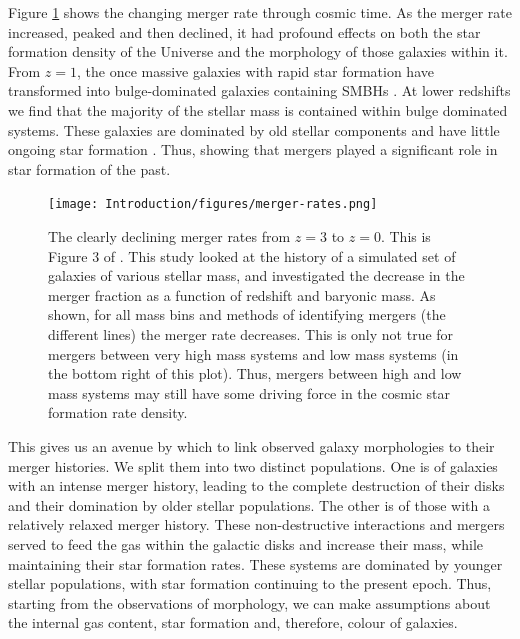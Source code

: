 Figure \ref{fig:merger-rate} shows the changing merger rate through cosmic time. As the merger rate increased, peaked and then declined, it had profound effects on both the star formation density of the Universe and the morphology of those galaxies within it. From $z = 1$, the once massive galaxies with rapid star formation have transformed into bulge-dominated galaxies containing SMBHs \citep{2007ApJ...654..858B}. At lower redshifts we find that the majority of the stellar mass is contained within bulge dominated systems. These galaxies are dominated by old stellar components and have little ongoing star formation \citep{2002AJ....124..646H, 2004ApJ...608..752B}. Thus, showing that mergers played a significant role in star formation of the past. 

\begin{figure}
    \centering
    \texttt{[image: Introduction/figures/merger-rates.png]}
    \caption[The declining merger rates from z = 3 to z = 0.]{The clearly declining merger rates from $z = 3$ to $z = 0$. This is Figure 3 of \citet{2010ApJ...715..202H}. This study looked at the history of a simulated set of galaxies of various stellar mass, and investigated the decrease in the merger fraction as a function of redshift and baryonic mass. As shown, for all mass bins and methods of identifying mergers (the different lines) the merger rate decreases. This is only not true for mergers between very high mass systems and low mass systems (in the bottom right of this plot). Thus, mergers between high and low mass systems may still have some driving force in the cosmic star formation rate density.}
    \label{fig:merger-rate}
\end{figure}

This gives us an avenue by which to link observed galaxy morphologies to their merger histories. We split them into two distinct populations. One is of galaxies with an intense merger history, leading to the complete destruction of their disks and their domination by older stellar populations. The other is of those with a relatively relaxed merger history. These non-destructive interactions and mergers served to feed the gas within the galactic disks and increase their mass, while maintaining their star formation rates. These systems are dominated by younger stellar populations, with star formation continuing to the present epoch. Thus, starting from the observations of morphology, we can make assumptions about the internal gas content, star formation and, therefore, colour of galaxies.

